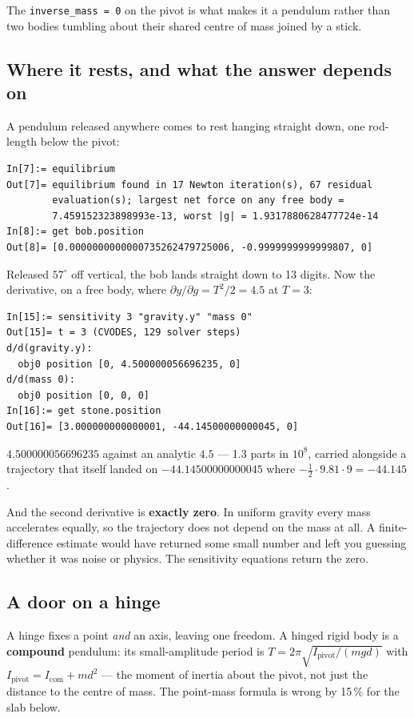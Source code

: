 \documentclass[11pt]{article}
\newcommand{\code}[1]{\texttt{#1}}
\begin{document}
The \code{inverse\_mass = 0} on the pivot is what makes it a pendulum
rather than two bodies tumbling about their shared centre of mass joined
by a stick.

\subsection{Where it rests, and what the answer depends on}

A pendulum released anywhere comes to rest hanging straight down, one
rod-length below the pivot:

\begin{lstlisting}
In[7]:= equilibrium
Out[7]= equilibrium found in 17 Newton iteration(s), 67 residual
        evaluation(s); largest net force on any free body =
        7.459152323898993e-13, worst |g| = 1.9317880628477724e-14
In[8]:= get bob.position
Out[8]= [0.0000000000000735262479725006, -0.9999999999999807, 0]
\end{lstlisting}

Released $57^\circ$ off vertical, the bob lands straight down to 13
digits. Now the derivative, on a free body, where
$\partial y/\partial g = T^2/2 = 4.5$ at $T=3$:

\begin{lstlisting}
In[15]:= sensitivity 3 "gravity.y" "mass 0"
Out[15]= t = 3 (CVODES, 129 solver steps)
d/d(gravity.y):
  obj0 position [0, 4.500000056696235, 0]
d/d(mass 0):
  obj0 position [0, 0, 0]
In[16]:= get stone.position
Out[16]= [3.000000000000001, -44.14500000000045, 0]
\end{lstlisting}

$4.500000056696235$ against an analytic $4.5$ --- 1.3 parts in $10^8$,
carried alongside a trajectory that itself landed on
$-44.14500000000045$ where $-\tfrac12\cdot 9.81\cdot 9 = -44.145$.

And the second derivative is \textbf{exactly zero}. In uniform gravity
every mass accelerates equally, so the trajectory does not depend on the
mass at all. A finite-difference estimate would have returned some small
number and left you guessing whether it was noise or physics. The
sensitivity equations return the zero.

\subsection{A door on a hinge}

A hinge fixes a point \emph{and} an axis, leaving one freedom. A hinged
rigid body is a \textbf{compound} pendulum: its small-amplitude period is
$T = 2\pi\sqrt{I_{\text{pivot}}/(mgd)}$ with
$I_{\text{pivot}} = I_{\text{com}} + md^2$ --- the moment of inertia
about the pivot, not just the distance to the centre of mass. The
point-mass formula is wrong by 15\,\% for the slab below.
\end{document}
